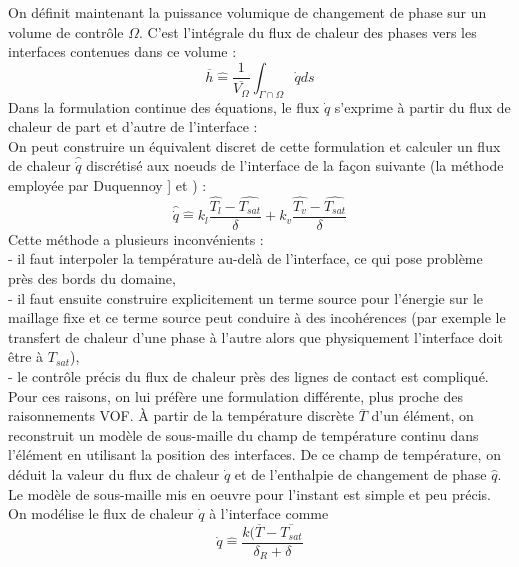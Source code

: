 On d\'efinit maintenant la puissance volumique de changement de phase sur un volume de contr\^ole $\Omega$. C'est l'int\'egrale du flux de chaleur des phases vers les interfaces contenues dans ce volume :
\begin{equation}
\overline{h} \hat{=} \dfrac{1}{\overline{V_{\Omega}}} \int_{\Gamma\cap\Omega} \dot{q} ds
\end{equation}
Dans la formulation continue des \'equations, le flux $\dot{q}$ s'exprime \`a partir du flux de chaleur de part et d'autre de l'interface :
\begin{equation}
\end{equation}
On peut construire un \'equivalent discret de cette formulation et calculer un flux de chaleur $\hat{\dot{q}}$ discr\'etis\'e aux noeuds de l'interface de la fa\c con suivante (la m\'ethode employ\'ee par Duquennoy \cite{Duquennoy2000}] et \cite{Shin2002}) :
\begin{equation}
\hat{\dot{q}} \hat{=} k_{l} \dfrac{\hat{T_{l}} - \hat{T_{sat}}}{\delta} + k_{v} \dfrac{\hat{T_{v}} - \hat{T_{sat}}}{\delta}
\end{equation}
Cette m\'ethode a plusieurs inconv\'enients :\\
- il faut interpoler la temp\'erature au-delà de l'interface, ce qui pose probl\`eme\\
pr\`es des bords du domaine,\\
- il faut ensuite construire explicitement un terme source pour l'\'energie sur
le maillage fixe et ce terme source peut conduire \`a des incoh\'erences (par
exemple le transfert de chaleur d'une phase \`a l'autre alors que physiquement
l'interface doit \^etre \`a $T_{sat}$),\\
- le contr\^ole pr\'ecis du flux de chaleur pr\`es des lignes de contact est compliqu\'e.\\
Pour ces raisons, on lui pr\'ef\`ere une formulation diff\'erente, plus proche des raisonnements VOF. \`A partir de la temp\'erature discrète $\overline{T}$ d'un \'el\'ement, on reconstruit un mod\`ele de sous-maille du champ de temp\'erature continu dans l'\'el\'ement en utilisant la position des interfaces. De ce champ de temp\'erature, on d\'eduit la valeur du flux de chaleur $\dot{q}$ et de l'enthalpie de changement de phase $\hat{q}$.\\
Le mod\`ele de sous-maille mis en oeuvre pour l'instant est simple et peu pr\'ecis.
On mod\'elise le flux de chaleur $\dot{q}$ \`a l'interface comme
\begin{equation}
\dot{q} \hat{=} \dfrac{k(\overline{T}-\overline{T_{sat}}}{\delta_{R}+\delta}
\end{equation}
